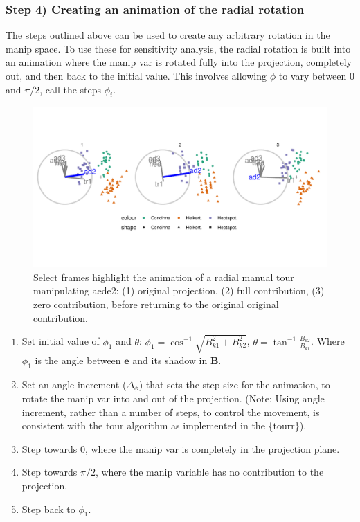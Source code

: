 \documentclass{monashthesis}
\begin{document}
\hypertarget{step-4-creating-an-animation-of-the-radial-rotation}{%
\subsubsection{Step 4) Creating an animation of the radial rotation}\label{step-4-creating-an-animation-of-the-radial-rotation}}

The steps outlined above can be used to create any arbitrary rotation in the manip space. To use these for sensitivity analysis, the radial rotation is built into an animation where the manip var is rotated fully into the projection, completely out, and then back to the initial value. This involves allowing \(\phi\) to vary between \(0\) and \(\pi/2\), call the steps \(\phi_i\).

\begin{figure}

{\centering \includegraphics[width=1\linewidth,]{./figures_from_script/ch3_fig3_filmstrip} 

}

\caption{Select frames highlight the animation of a radial manual tour manipulating aede2: (1) original projection, (2) full contribution, (3) zero contribution, before returning to the original original contribution.}\label{fig:ch3fig3}
\end{figure}

\begin{enumerate}
\def\labelenumi{\arabic{enumi}.}
\tightlist
\item
  Set initial value of \(\phi_1\) and \(\theta\): \(\phi_1 = \cos^{-1}{\sqrt{B_{k1}^2+B_{k2}^2}}\), \(\theta = \tan^{-1}\frac{B_{k2}}{B_{k1}}\). Where \(\phi_1\) is the angle between \(\textbf{e}\) and its shadow in \(\textbf{B}\).
\item
  Set an angle increment (\(\Delta_\phi\)) that sets the step size for the animation, to rotate the manip var into and out of the projection. (Note: Using angle increment, rather than a number of steps, to control the movement, is consistent with the tour algorithm as implemented in the \{tourr\}).
\item
  Step towards \(0\), where the manip var is completely in the projection plane.
\item
  Step towards \(\pi/2\), where the manip variable has no contribution to the projection.
\item
  Step back to \(\phi_1\).
\end{enumerate}
\end{document}
